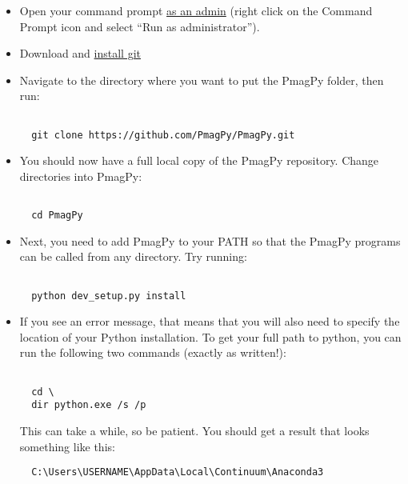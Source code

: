 \documentclass[11pt]{article}
\begin{document}
\begin{itemize}

\item Open your command prompt \href{http://www.thewindowsclub.com/how-to-run-command-prompt-as-an-administrator}{as an admin} (right click on the Command Prompt icon and select ``Run as administrator'').

\item Download and \href{https://git-scm.com/downloads}{install git}

  \item Navigate to the directory where you want to put the PmagPy folder, then run:

\begin{verbatim}

  git clone https://github.com/PmagPy/PmagPy.git
\end{verbatim}

\item You should now have a full local copy of the PmagPy repository.  Change directories into PmagPy:

\begin{verbatim}

  cd PmagPy
\end{verbatim}


\item Next, you need to add PmagPy to your PATH so that the PmagPy programs can be called from any directory. Try running:

\begin{verbatim}

  python dev_setup.py install
\end{verbatim}


\item  If you see an error message, that means that you will also need to specify the location of your Python installation.  To get your full path to python, you can run the following two commands (exactly as written!):

\begin{verbatim}

  cd \
  dir python.exe /s /p
\end{verbatim}

This can take a while, so be patient.  You should get a result that looks something like this:

\begin{verbatim}
  C:\Users\USERNAME\AppData\Local\Continuum\Anaconda3
\end{verbatim}


\end{itemize}
\end{document}

